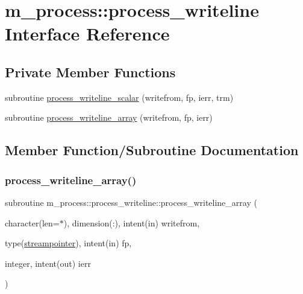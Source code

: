\hypertarget{interfacem__process_1_1process__writeline}{}\section{m\+\_\+process\+:\+:process\+\_\+writeline Interface Reference}
\label{interfacem__process_1_1process__writeline}
\subsection*{Private Member Functions}
\begin{DoxyCompactItemize}
\item 
subroutine \mbox{\hyperlink{interfacem__process_1_1process__writeline_a9e95166556bec54fd10568f01d02f34e}{process\+\_\+writeline\+\_\+scalar}} (writefrom, fp, ierr, trm)
\item 
subroutine \mbox{\hyperlink{interfacem__process_1_1process__writeline_aa3543e9b23056b2f35869003f777f65d}{process\+\_\+writeline\+\_\+array}} (writefrom, fp, ierr)
\end{DoxyCompactItemize}


\subsection{Member Function/\+Subroutine Documentation}
\mbox{\label{interfacem__process_1_1process__writeline_aa3543e9b23056b2f35869003f777f65d}} 
\subsubsection{\texorpdfstring{process\+\_\+writeline\+\_\+array()}{process\_writeline\_array()}}
{\footnotesize\ttfamily subroutine m\+\_\+process\+::process\+\_\+writeline\+::process\+\_\+writeline\+\_\+array (\begin{DoxyParamCaption}\item[{character(len=$\ast$), dimension(\+:), intent(in)}]{writefrom,  }\item[{type(\mbox{\hyperlink{structm__process_1_1streampointer}{streampointer}}), intent(in)}]{fp,  }\item[{integer, intent(out)}]{ierr }\end{DoxyParamCaption})\hspace{0.3cm}{\ttfamily [private]}}

